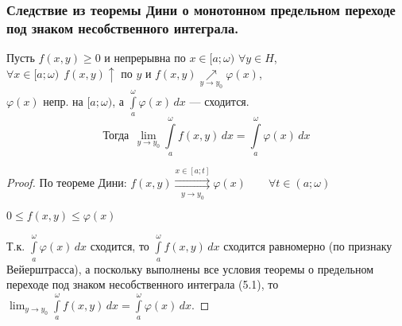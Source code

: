 \subsubsection{Следствие из теоремы Дини о монотонном предельном переходе под знаком несобственного интеграла.}
\begin{corollary}
    Пусть $f(x, y) \ge 0$ и непрерывна по $x \in [a; \omega)$ $\forall y \in H$, \\
    \phantom{Пусть} $\forall x \in [a; \omega) \ \ f(x, y) \uparrow$ по $y$ и $f(x, y) \underset{y \to y_0}{\nearrow} 
    \varphi(x)$, \\
    \phantom{Пусть} $\varphi(x)$ непр. на $[a; \omega)$, а $\int\limits_a^{\omega} \varphi(x)\,dx$ --- сходится.
    \[ \text{Тогда} \ \ \lim_{y \to y_0} \int\limits_a^{\omega} f(x, y)\,dx = \int\limits_a^{\omega} \varphi(x)\,dx \]
\end{corollary}
\begin{proof}
    По теореме Дини: $f(x, y) \overset{x \in [a; t]}{\underset{y \to y_0}{\rightrightarrows}} \varphi(x) \qquad
    \forall t \in (a; \omega)$
    
    $0 \le f(x, y) \le \varphi(x)$
    
    Т.к. $\int\limits_a^{\omega} \varphi(x)\,dx$ сходится, то $\int\limits_a^{\omega} f(x, y)\,dx$ сходится равномерно (по признаку Вейерштрасса),
    а поскольку выполнены все условия теоремы о предельном переходе под знаком несобственного интеграла (5.1),
    то $\lim_{y \to y_0} \int\limits_a^{\omega} f(x, y)\,dx = \int\limits_a^{\omega} \varphi(x)\,dx$.
\end{proof}

